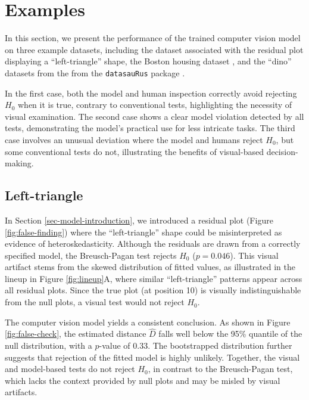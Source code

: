 \documentclass[]{interact}
\theoremstyle{plain}%
\theoremstyle{definition}
\theoremstyle{remark}
\begin{document}
\section{Examples}\label{sec-examples}

In this section, we present the performance of the trained computer
vision model on three example datasets, including the dataset associated
with the residual plot displaying a ``left-triangle'' shape, the Boston
housing dataset \citep{harrison1978hedonic}, and the ``dino'' datasets
from the from the \texttt{datasauRus} package \citep{datasaurus}.

In the first case, both the model and human inspection correctly avoid
rejecting \(H_0\) when it is true, contrary to conventional tests,
highlighting the necessity of visual examination. The second case shows
a clear model violation detected by all tests, demonstrating the model's
practical use for less intricate tasks. The third case involves an
unusual deviation where the model and humans reject \(H_0\), but some
conventional tests do not, illustrating the benefits of visual-based
decision-making.

\subsection{Left-triangle}\label{left-triangle}

In Section \ref{sec-model-introduction}, we introduced a residual plot
(Figure \ref{fig:false-finding}) where the ``left-triangle'' shape could
be misinterpreted as evidence of heteroskedasticity. Although the
residuals are drawn from a correctly specified model, the Breusch-Pagan
test rejects \(H_0\) (\(p = 0.046\)). This visual artifact stems from
the skewed distribution of fitted values, as illustrated in the lineup
in Figure \ref{fig:lineup}A, where similar ``left-triangle'' patterns
appear across all residual plots. Since the true plot (at position 10)
is visually indistinguishable from the null plots, a visual test would
not reject \(H_0\).

The computer vision model yields a consistent conclusion. As shown in
Figure \ref{fig:false-check}, the estimated distance \(\hat{D}\) falls
well below the 95\% quantile of the null distribution, with a
\(p\)-value of \(0.33\). The bootstrapped distribution further suggests
that rejection of the fitted model is highly unlikely. Together, the
visual and model-based tests do not reject \(H_0\), in contrast to the
Breusch-Pagan test, which lacks the context provided by null plots and
may be misled by visual artifacts.
\end{document}
